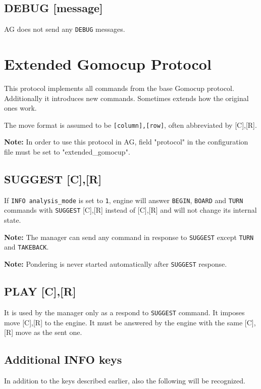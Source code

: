 \documentclass[12pt,a4paper]{article}
\begin{document}
\subsection{DEBUG [message]}
\label{cmd_debug}
AG does not send any \texttt{DEBUG} messages.


\newpage
\section{Extended Gomocup Protocol}
This protocol implements all commands from the base Gomocup protocol. Additionally it introduces new commands. Sometimes extends how the original ones work.

The move format is assumed to be \texttt{[column],[row]}, often abbreviated by [C],[R].

\textbf{Note:} In order to use this protocol in AG, field "protocol" in the configuration file must be set to "extended{\_}gomocup".

\subsection{SUGGEST [C],[R]}
\label{cmd_suggest}
If \texttt{INFO analysis{\_}mode} is set to \texttt{1}, engine will answer \texttt{BEGIN}, \texttt{BOARD} and \texttt{TURN} commands with \texttt{SUGGEST} [C],[R] instead of [C],[R] and will not change its internal state.

\textbf{Note:} The manager can send any command in response to \texttt{SUGGEST} except \texttt{TURN} and \texttt{TAKEBACK}.

\textbf{Note:} Pondering is never started automatically after \texttt{SUGGEST} response.


\subsection{PLAY [C],[R]}
\label{cmd_play}
It is used by the manager only as a respond to \texttt{SUGGEST} command. It imposes move [C],[R] to the engine. It must be answered by the engine with the same [C],[R] move as the sent one.


\subsection{Additional INFO keys}
\label{cmd_info_extension1}
In addition to the keys described earlier, also the following will be recognized.
\end{document}
